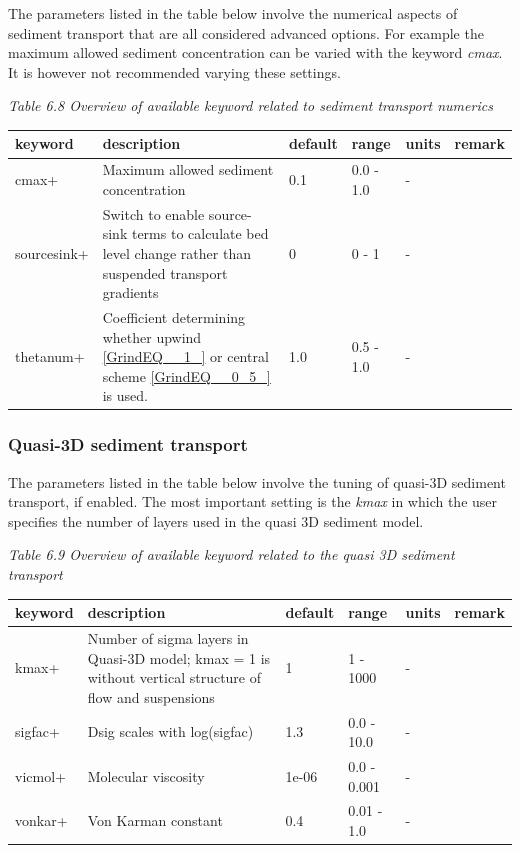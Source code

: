 \documentclass{article}
\begin{document}
\noindent The parameters listed in the table below involve the numerical aspects of sediment transport that are all considered advanced options. For example the maximum allowed sediment concentration can be varied with the keyword \textit{cmax}. It is however not recommended varying these settings.

\noindent \textit{Table 6.8 Overview of available keyword related to sediment transport numerics}

\begin{tabular}{|p{0.8in}|p{1.1in}|p{0.6in}|p{0.7in}|p{0.4in}|p{0.6in}|} \hline 
keyword & description & default & range & units & remark \\ \hline 
cmax+ & Maximum allowed sediment concentration & 0.1 & 0.0 - 1.0 & - &  \\ \hline 
sourcesink+ & Switch to enable source-sink terms to calculate bed level change rather than suspended transport gradients & 0 & 0 - 1 & - &  \\ \hline 
thetanum+ & Coefficient determining whether upwind \eqref{GrindEQ__1_} or central scheme \eqref{GrindEQ__0_5_} is used. & 1.0 & 0.5 - 1.0 & - &  \\ \hline 
\end{tabular}


\subsubsection{ Quasi-3D sediment transport}

\noindent The parameters listed in the table below involve the tuning of quasi-3D sediment transport, if enabled. The most important setting is the \textit{kmax} in which the user specifies the number of layers used in the quasi 3D sediment model.

\noindent \textit{Table 6.9 Overview of available keyword related to the quasi 3D sediment transport}

\begin{tabular}{|p{0.7in}|p{1.1in}|p{0.6in}|p{0.7in}|p{0.4in}|p{0.7in}|} \hline 
keyword & description & default & range & units & remark \\ \hline 
kmax+ & Number of sigma layers in Quasi-3D model; kmax = 1 is without vertical structure of flow and suspensions & 1 & 1 - 1000 & - &  \\ \hline 
sigfac+ & Dsig scales with log(sigfac) & 1.3 & 0.0 - 10.0 & - &  \\ \hline 
vicmol+ & Molecular viscosity & 1e-06 & 0.0 - 0.001 & - &  \\ \hline 
vonkar+ & Von Karman constant & 0.4 & 0.01 - 1.0 & - &  \\ \hline 
\end{tabular}
\end{document}
